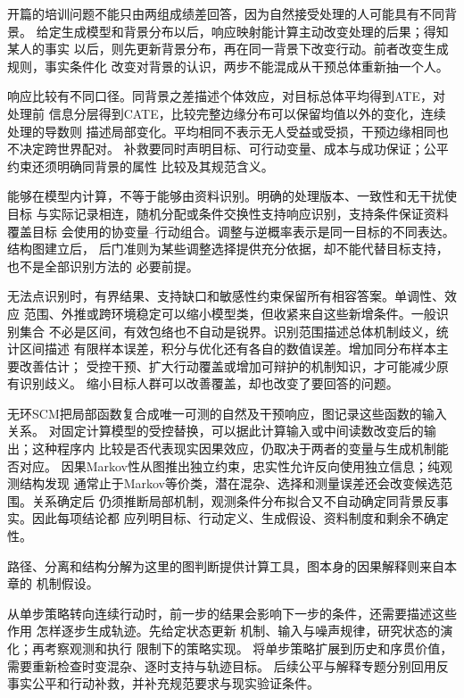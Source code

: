 开篇的培训问题不能只由两组成绩差回答，因为自然接受处理的人可能具有不同背景。
给定生成模型和背景分布以后，响应映射能计算主动改变处理的后果；得知某人的事实
以后，则先更新背景分布，再在同一背景下改变行动。前者改变生成规则，事实条件化
改变对背景的认识，两步不能混成从干预总体重新抽一个人。

响应比较有不同口径。同背景之差描述个体效应，对目标总体平均得到ATE，对处理前
信息分层得到CATE，比较完整边缘分布可以保留均值以外的变化，连续处理的导数则
描述局部变化。平均相同不表示无人受益或受损，干预边缘相同也不决定跨世界配对。
补救要同时声明目标、可行动变量、成本与成功保证；公平约束还须明确同背景的属性
比较及其规范含义。

能够在模型内计算，不等于能够由资料识别。明确的处理版本、一致性和无干扰使目标
与实际记录相连，随机分配或条件交换性支持响应识别，支持条件保证资料覆盖目标
会使用的协变量--行动组合。调整与逆概率表示是同一目标的不同表达。结构图建立后，
后门准则为某些调整选择提供充分依据，却不能代替目标支持，也不是全部识别方法的
必要前提。

无法点识别时，有界结果、支持缺口和敏感性约束保留所有相容答案。单调性、效应
范围、外推或跨环境稳定可以缩小模型类，但收紧来自这些新增条件。一般识别集合
不必是区间，有效包络也不自动是锐界。识别范围描述总体机制歧义，统计区间描述
有限样本误差，积分与优化还有各自的数值误差。增加同分布样本主要改善估计；
受控干预、扩大行动覆盖或增加可辩护的机制知识，才可能减少原有识别歧义。
缩小目标人群可以改善覆盖，却也改变了要回答的问题。

无环SCM把局部函数复合成唯一可测的自然及干预响应，图记录这些函数的输入关系。
对固定计算模型的受控替换，可以据此计算输入或中间读数改变后的输出；这种程序内
比较是否代表现实因果效应，仍取决于两者的变量与生成机制能否对应。
因果Markov性从图推出独立约束，忠实性允许反向使用独立信息；纯观测结构发现
通常止于Markov等价类，潜在混杂、选择和测量误差还会改变候选范围。关系确定后
仍须推断局部机制，观测条件分布拟合又不自动确定同背景反事实。因此每项结论都
应列明目标、行动定义、生成假设、资料制度和剩余不确定性。

路径、分离和结构分解为这里的图判断提供计算工具，图本身的因果解释则来自本章的
机制假设。

从单步策略转向连续行动时，前一步的结果会影响下一步的条件，还需要描述这些作用
怎样逐步生成轨迹。先给定状态更新
机制、输入与噪声规律，研究状态的演化；再考察观测和执行
限制下的策略实现。
将单步策略扩展到历史和序贯价值，
需要重新检查时变混杂、逐时支持与轨迹目标。
后续公平与解释专题分别回用反事实公平和行动补救，并补充规范要求与现实验证条件。

